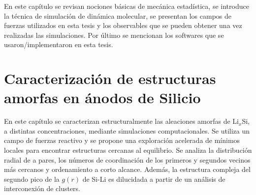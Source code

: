 \documentclass[12pt,spanish,a4paper]{book}
\newcommand\blankpage{%
    \null
    \thispagestyle{empty}%
    \addtocounter{page}{-1}%
    \newpage}
\begin{document}
\vspace{50pt}

\begin{adjustwidth}{50pt}{50pt}
    En este capítulo se revisan nociones básicas de mecánica estadística, se 
    introduce la técnica de simulación de dinámica molecular, se presentan los 
    campos de fuerzas utilizados en esta tesis y los observables que se pueden 
    obtener una vez realizadas las simulaciones. Por último se mencionan los 
    softwares que se usaron/implementaron en esta tesis.
\end{adjustwidth}

\clearpage
\blankpage



\chapter[Estructuras amorfas en ánodos de Silicio]{Caracterización de estructuras
amorfas en ánodos de Silicio}
\thispagestyle{empty}

\vspace{50pt}

\begin{adjustwidth}{50pt}{50pt}
    En este capítulo se caracterizan estructuralmente las aleaciones amorfas de
    Li$_x$Si, a distintas concentraciones, mediante simulaciones computacionales. 
    Se utiliza un campo de fuerzas reactivo y se propone una exploración acelerada
    de mínimos locales para encontrar estructuras cercanas al equilibrio. Se
    analiza la distribución radial de a pares, los números de coordinación de los
    primeros y segundos vecinos más cercanos y ordenamiento a corto alcance.
    Además, la estructura compleja del segundo pico de la $g(r)$ de Si-Li es 
    dilucidada a partir de un análisis de interconexión de clusters.
\end{adjustwidth}

\clearpage
\blankpage



% 



\end{document}
